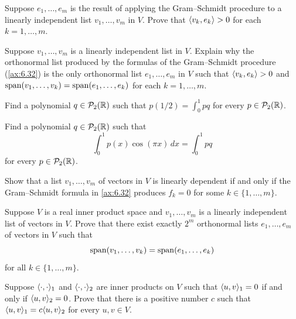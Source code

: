 \begin{exc}
\begin{exercise}
Suppose $e_1,\dots,e_m$ is the result of applying the Gram--Schmidt procedure to
a linearly independent list $v_1,\dots,v_m$ in $V$. Prove that
$\langle v_k, e_k \rangle>0$ for each $k=1,\dots,m$.
\end{exercise}

\begin{exercise}
Suppose $v_1,\dots,v_m$ is a linearly independent list in $V$. Explain why the
orthonormal list produced by the formulas of the Gram--Schmidt procedure
(\ref{ax:6.32}) is the only orthonormal list $e_1,\dots,e_m$ in $V$ such that
$\langle v_k, e_k \rangle>0$ and $\operatorname{span}(v_1,\dots,v_k)=\operatorname{span}(e_1,\dots,e_k)$ for each
$k=1,\dots,m$.
\end{exercise}

\begin{exercise}
Find a polynomial $q\in\mathcal{P}_2(\mathbb{R})$ such that
$p(1/2)=\int_0^1 pq$ for every $p\in\mathcal{P}_2(\mathbb{R})$.
\end{exercise}

\begin{exercise}
Find a polynomial $q\in\mathcal{P}_2(\mathbb{R})$ such that
\[ \int_0^1 p(x)\cos(\pi x)\,dx = \int_0^1 pq \]
for every $p\in\mathcal{P}_2(\mathbb{R})$.
\end{exercise}

\begin{exercise}
Show that a list $v_1,\dots,v_m$ of vectors in $V$ is linearly dependent if and
only if the Gram--Schmidt formula in \ref{ax:6.32} produces $f_k=0$ for some
$k\in\{1,\dots,m\}$.
\end{exercise}

\begin{exercise}
Suppose $V$ is a real inner product space and $v_1,\dots,v_m$ is a linearly
independent list of vectors in $V$. Prove that there exist exactly $2^m$
orthonormal lists $e_1,\dots,e_m$ of vectors in $V$ such that
\[ \operatorname{span}(v_1,\dots,v_k) = \operatorname{span}(e_1,\dots,e_k) \]
for all $k\in\{1,\dots,m\}$.
\end{exercise}

\begin{exercise}
Suppose $\langle \cdot, \cdot \rangle_1$ and $\langle \cdot, \cdot \rangle_2$ are inner products on $V$
such that $\langle u, v \rangle_1=0$ if and only if $\langle u, v \rangle_2=0$. Prove that there is a
positive number $c$ such that $\langle u, v \rangle_1=c\langle u, v \rangle_2$ for every $u,v\in V$.
\end{exercise}


\end{exc}
